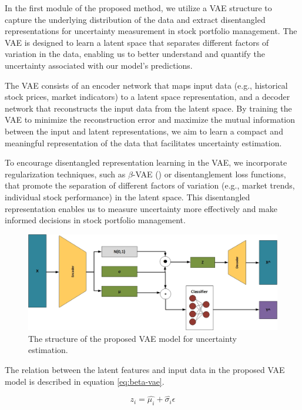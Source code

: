 In the first module of the proposed method, we utilize a VAE structure to capture the underlying distribution of the data and extract disentangled representations for uncertainty measurement in stock portfolio management. The VAE is designed to learn a latent space that separates different factors of variation in the data, enabling us to better understand and quantify the uncertainty associated with our model's predictions.

The VAE consists of an encoder network that maps input data (e.g., historical stock prices, market indicators) to a latent space representation, and a decoder network that reconstructs the input data from the latent space. By training the VAE to minimize the reconstruction error and maximize the mutual information between the input and latent representations, we aim to learn a compact and meaningful representation of the data that facilitates uncertainty estimation.

To encourage disentangled representation learning in the VAE, we incorporate regularization techniques, such as $\beta$-VAE (\citet{burgess2018understanding}) or disentanglement loss functions, that promote the separation of different factors of variation (e.g., market trends, individual stock performance) in the latent space. This disentangled representation enables us to measure uncertainty more effectively and make informed decisions in stock portfolio management.

\begin{figure}[H]
	\centering
	\includegraphics[scale=0.4]{./VAE.jpg}
	\caption{The structure of the proposed VAE model for uncertainty estimation.}
	\label{fig:vae}
\end{figure}

The relation between the latent features and input data in the proposed VAE model is described in equation \eqref{eq:beta-vae}.

\begin{equation}
	z_i = \hat{\mu_i} + \hat{\sigma_i} \epsilon
	\label{eq:beta-vae}
\end{equation}

